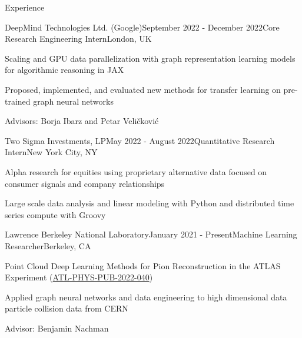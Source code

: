 \documentclass{resume} %
\begin{document}
\begin{rSection}{Experience}

\begin{rSubsection}{DeepMind Technologies Ltd. (Google)}{September 2022 - December 2022}{Core Research Engineering Intern}{London, UK}
    \item Scaling and GPU data parallelization with graph representation learning models for algorithmic reasoning in JAX
    \item Proposed, implemented, and evaluated new methods for transfer learning on pre-trained graph neural networks
    \item Advisors: Borja Ibarz and Petar Veličković
\end{rSubsection}

\begin{rSubsection}{Two Sigma Investments, LP}{May 2022 - August 2022}{Quantitative Research Intern}{New York City, NY}
     \item Alpha research for equities using proprietary alternative data focused on consumer signals and company relationships
     \item Large scale data analysis and linear modeling with Python and distributed time series compute with Groovy
\end{rSubsection}

\begin{rSubsection}{Lawrence Berkeley National Laboratory}{January 2021 - Present}{Machine Learning Researcher}{Berkeley, CA}
    \item Point Cloud Deep Learning Methods for Pion Reconstruction in the ATLAS Experiment (\href{https://cds.cern.ch/record/2825379/files/ATL-PHYS-PUB-2022-040.pdf}{ATL-PHYS-PUB-2022-040})    
    \item Applied graph neural networks and data engineering to high dimensional data particle collision data from CERN
    \item Advisor: Benjamin Nachman
\end{rSubsection}


\end{rSection}
\end{document}
